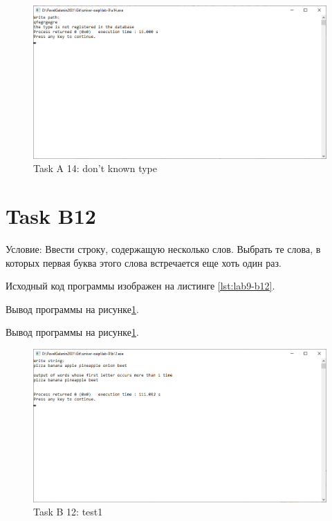 \documentclass[12pt,a4paper]{article}
\begin{document}
\begin{figure}[ht]
  \centering
  \includegraphics[width=16cm]{imgs/a14none.png}
  \caption{Task A 14: don't known type}
  \label{fig:a14-none}
\end{figure}

\clearpage

\section{Task B12}

\begin{conductionB12}
Условие: Ввести строку, содержащую несколько слов. Выбрать те слова, в
которых первая буква этого слова встречается еще хоть один раз.
\end{conductionB12}

Исходный код программы изображен на листинге \ref{lst:lab9-b12}.

Вывод программы на рисунке\ref{fig:a14-none}.

Вывод программы на рисунке\ref{fig:a14-none}.



\begin{figure}[ht]
  \centering
  \includegraphics[width=16cm]{imgs/b12-test1.png}
  \caption{Task B 12: test1}
  \label{fig:b12-test1}
\end{figure}
\end{document}
